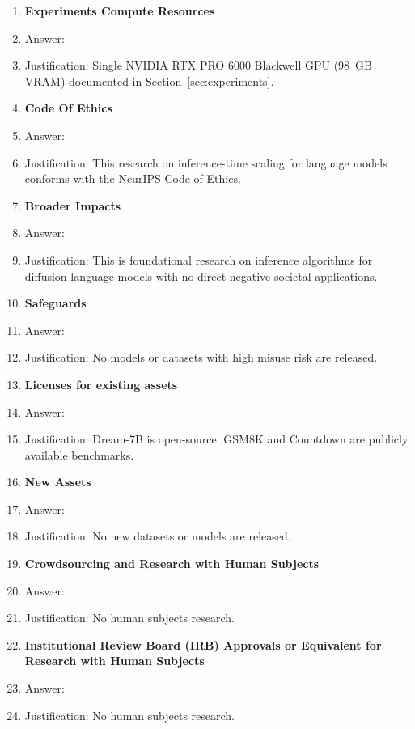 \documentclass{article}
\begin{document}
\begin{enumerate}
\item {\bf Experiments Compute Resources}
    \item[] Answer: \answerYes{}
    \item[] Justification: Single NVIDIA RTX PRO 6000 Blackwell GPU (98~GB VRAM) documented in Section~\ref{sec:experiments}.

\item {\bf Code Of Ethics}
    \item[] Answer: \answerYes{}
    \item[] Justification: This research on inference-time scaling for language models conforms with the NeurIPS Code of Ethics.

\item {\bf Broader Impacts}
    \item[] Answer: \answerNA{}
    \item[] Justification: This is foundational research on inference algorithms for diffusion language models with no direct negative societal applications.

\item {\bf Safeguards}
    \item[] Answer: \answerNA{}
    \item[] Justification: No models or datasets with high misuse risk are released.

\item {\bf Licenses for existing assets}
    \item[] Answer: \answerYes{}
    \item[] Justification: Dream-7B is open-source. GSM8K and Countdown are publicly available benchmarks.

\item {\bf New Assets}
    \item[] Answer: \answerNA{}
    \item[] Justification: No new datasets or models are released.

\item {\bf Crowdsourcing and Research with Human Subjects}
    \item[] Answer: \answerNA{}
    \item[] Justification: No human subjects research.

\item {\bf Institutional Review Board (IRB) Approvals or Equivalent for Research with Human Subjects}
    \item[] Answer: \answerNA{}
    \item[] Justification: No human subjects research.

\end{enumerate}
\end{document}
